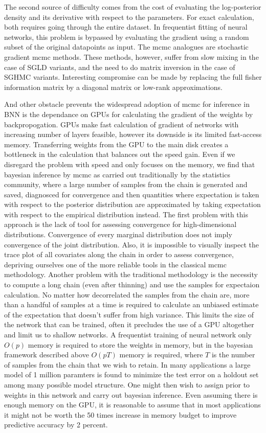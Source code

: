 \documentclass[12pt]{report}
\begin{document}
\begin{enumerate}
The second source of difficulty comes from the cost of evaluating the
log-posterior density and its derivative with respect to the parameters. For
exact calculation, both requires going through the entire dataset. In
frequentist fitting of neural networks, this problem is bypassed by evaluating
the gradient using a random subset of the original datapoints as input. The mcmc
analogues are stochastic gradient mcmc methods. These methods, however, suffer
from slow mixing in the case of SGLD variants, and the need to do matrix
inversion in the case of SGHMC variants. Interesting compromise can be made by
replacing the full fisher information matrix by a diagonal matrix or low-rank
approximations. 

And other obstacle prevents the widespread adoption of mcmc for inference in BNN
is the dependance on GPUs for calculating the gradient of the weights by
backpropogation. GPUs make fast calculation of gradient of networks with
increasing number of layers feasible, however its downside is its limited
fast-access memory. Transferring weights from the GPU to the main disk creates a
bottleneck in the calculation that balances out the speed gain. Even if we
disregard the problem with speed and only focuses on the memory, we find that
bayesian inference by mcmc as carried out traditionally by the statistics
community, where a large number of samples from the chain is generated and
saved, diagnosced for convergence and then quantities where expectation is taken
with respect to the posterior distribution are approximated by taking
expectation with respect to the empirical distribution instead. The first
problem with this approach is the lack of tool for assessing convergence for
high-dimensional distributions. Convergence of every marginal distribution does
not imply convergence of the joint distribution. Also, it is impossible to
visually inspect
the trace plot of all covariates along the chain in order to assess convergence,
depriving ourselves one of the more reliable tools in the classical mcmc
methodology. Another problem with the traditional methodology is the necessity
to compute a long chain (even after thinning) and use the samples for expectaion
calculation. No matter how decorrelated the samples from the chain are,
more than a handful of samples at a time is required to calculate an unbiased
estimate of the expectation that doesn't suffer from high variance. This limits
the size of the network that can be trained, often it precludes the use of a GPU
altogether and limit us to shallow networks. A frequentist training of neural
network only $O(p)$ memory is required to store the weights in memory, but in
the bayesian framework described above $O(pT)$ memory is required, where $T$ is
the number of samples from the chain that we wish to retain. In many
applications a large
model of 1 million paramters is found to minimize the test error on a holdout
set among many possible model structure. One might then wish to assign prior to
weights in this network and carry out bayesian inference. Even assuming there is
enough memory on the GPU, it is reasonable to assume that in most applications it might not be worth the 50 times increase in memory
budget to improve predictive accuracy by 2 percent. 


\end{enumerate}
\end{document}
